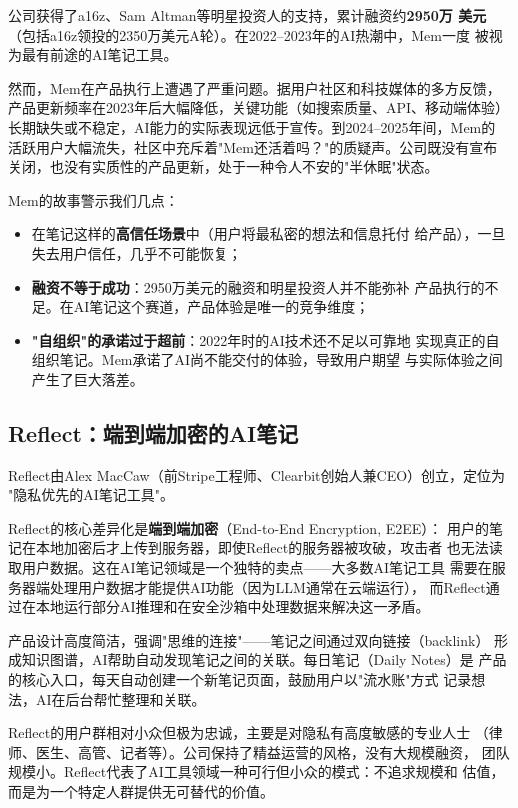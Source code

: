 公司获得了a16z、Sam Altman等明星投资人的支持，累计融资约\textbf{2950万
美元}（包括a16z领投的2350万美元A轮）。在2022--2023年的AI热潮中，Mem一度
被视为最有前途的AI笔记工具。

然而，Mem在产品执行上遭遇了严重问题。据用户社区和科技媒体的多方反馈，
产品更新频率在2023年后大幅降低，关键功能（如搜索质量、API、移动端体验）
长期缺失或不稳定，AI能力的实际表现远低于宣传。到2024--2025年间，Mem的
活跃用户大幅流失，社区中充斥着"Mem还活着吗？"的质疑声。公司既没有宣布
关闭，也没有实质性的产品更新，处于一种令人不安的"半休眠"状态。

Mem的故事警示我们几点：

\begin{itemize}
  \item 在笔记这样的\textbf{高信任场景}中（用户将最私密的想法和信息托付
    给产品），一旦失去用户信任，几乎不可能恢复；
  \item \textbf{融资不等于成功}：2950万美元的融资和明星投资人并不能弥补
    产品执行的不足。在AI笔记这个赛道，产品体验是唯一的竞争维度；
  \item \textbf{"自组织"的承诺过于超前}：2022年时的AI技术还不足以可靠地
    实现真正的自组织笔记。Mem承诺了AI尚不能交付的体验，导致用户期望
    与实际体验之间产生了巨大落差。
\end{itemize}

\subsection{Reflect：端到端加密的AI笔记}
\label{subsec:reflect}

Reflect由Alex MacCaw（前Stripe工程师、Clearbit创始人兼CEO）创立，定位为
"隐私优先的AI笔记工具"。

Reflect的核心差异化是\textbf{端到端加密}（End-to-End Encryption, E2EE）：
用户的笔记在本地加密后才上传到服务器，即使Reflect的服务器被攻破，攻击者
也无法读取用户数据。这在AI笔记领域是一个独特的卖点——大多数AI笔记工具
需要在服务器端处理用户数据才能提供AI功能（因为LLM通常在云端运行），
而Reflect通过在本地运行部分AI推理和在安全沙箱中处理数据来解决这一矛盾。

产品设计高度简洁，强调"思维的连接"——笔记之间通过双向链接（backlink）
形成知识图谱，AI帮助自动发现笔记之间的关联。每日笔记（Daily Notes）是
产品的核心入口，每天自动创建一个新笔记页面，鼓励用户以"流水账"方式
记录想法，AI在后台帮忙整理和关联。

Reflect的用户群相对小众但极为忠诚，主要是对隐私有高度敏感的专业人士
（律师、医生、高管、记者等）。公司保持了精益运营的风格，没有大规模融资，
团队规模小。Reflect代表了AI工具领域一种可行但小众的模式：不追求规模和
估值，而是为一个特定人群提供无可替代的价值。

